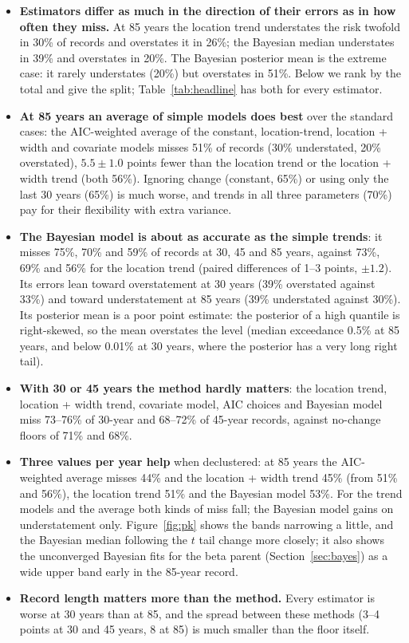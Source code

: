 \documentclass[11pt]{article}
\begin{document}
\begin{itemize}
\item \textbf{Estimators differ as much in the direction of their errors as in how often they
  miss.} At 85 years the location trend understates the risk twofold in 30\% of records and
  overstates it in 26\%; the Bayesian median understates in 39\% and overstates in 20\%. The
  Bayesian posterior mean is the extreme case: it rarely understates (20\%) but overstates in 51\%.
  Below we rank by the total and give the split; Table~\ref{tab:headline} has both for every
  estimator.
\item \textbf{At 85 years an average of simple models does best} over the standard cases: the
  AIC-weighted average of the constant, location-trend, location + width and covariate models misses
  51\% of records (30\% understated, 20\% overstated), $5.5\pm1.0$ points fewer than the location trend
  or the location + width trend (both 56\%). Ignoring change (constant, 65\%) or using only the last
  30 years (65\%) is much worse, and trends in all three parameters (70\%) pay for their flexibility
  with extra variance.
\item \textbf{The Bayesian model is about as accurate as the simple trends}: it misses 75\%, 70\% and
  59\% of records at 30, 45 and 85 years, against 73\%, 69\% and 56\% for the location trend (paired
  differences of 1--3 points, $\pm1.2$). Its errors lean toward overstatement at 30 years (39\%
  overstated against 33\%) and toward understatement at 85 years (39\% understated against 30\%).
  Its posterior mean is a poor point estimate: the posterior of a high quantile is right-skewed, so
  the mean overstates the level (median exceedance 0.5\% at 85 years, and below 0.01\% at 30 years,
  where the posterior has a very long right tail).
\item \textbf{With 30 or 45 years the method hardly matters}: the location trend, location + width
  trend, covariate model, AIC choices and Bayesian model miss 73--76\% of 30-year and 68--72\% of
  45-year records, against no-change floors of 71\% and 68\%.
\item \textbf{Three values per year help} when declustered: at 85 years the AIC-weighted average
  misses 44\% and the location + width trend 45\% (from 51\% and 56\%), the location trend 51\% and
  the Bayesian model 53\%. For the trend models and the average both kinds of miss fall; the
  Bayesian model gains on understatement only. Figure~\ref{fig:pk} shows the
  bands narrowing a little, and the Bayesian median following the $t$ tail change more closely; it
  also shows the unconverged Bayesian fits for the beta parent (Section~\ref{sec:bayes}) as a wide
  upper band early in the 85-year record.
\item \textbf{Record length matters more than the method.} Every estimator is worse at 30 years
  than at 85, and the spread between these methods (3--4 points at 30 and 45 years, 8 at 85) is
  much smaller than the floor itself.
\end{itemize}
\end{document}
